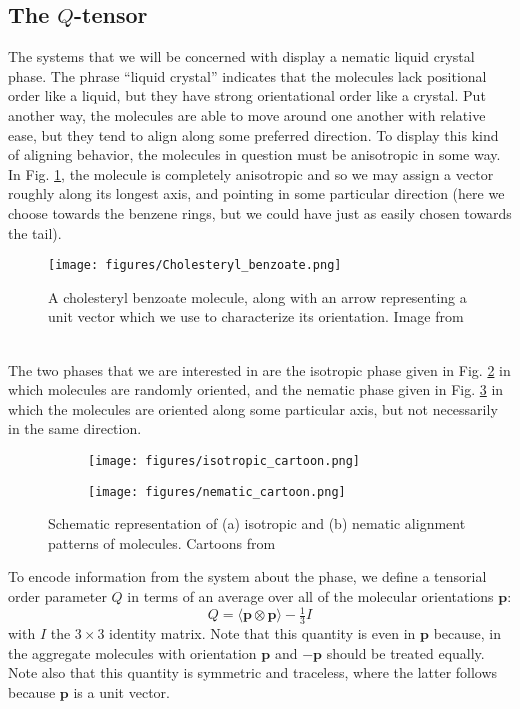 \documentclass[reqno]{article}
\begin{document}
	\subsection{The $Q$-tensor}
  The systems that we will be concerned with display a nematic liquid crystal phase.
  The phrase ``liquid crystal'' indicates that the molecules lack positional
  order like a liquid, but they have strong orientational order like a crystal.
  Put another way, the molecules are able to move around one another with
  relative ease, but they tend to align along some preferred direction.
  To display this kind of aligning behavior, the molecules in question must be
  anisotropic in some way.
  In Fig. \ref{fig:cholesteryl-benzoate}, the molecule is completely anisotropic and so we may
  assign a vector roughly along its longest axis, and pointing in some
  particular direction (here we choose towards the benzene rings, but we could
  have just as easily chosen towards the tail).
  \begin{figure}[h] 
    \centering
    \texttt{[image: figures/Cholesteryl\_benzoate.png]}
    \caption{A cholesteryl benzoate molecule, along with an arrow representing
      a unit vector which we use to characterize its orientation. Image from
      ~\cite{cholesteryl-benzoate}}
    \label{fig:cholesteryl-benzoate}
  \end{figure}

  The two phases that we are interested in are the isotropic phase given in
  Fig. \ref{fig:isotropic-cartoon} in which molecules are randomly oriented, and
  the nematic phase given in Fig. \ref{fig:nematic-cartoon} in which the
  molecules are oriented along some particular axis, but not necessarily in the
  same direction.
  \begin{figure}[h] 
    \centering
    \begin{subfigure}{0.4\textwidth}
      \texttt{[image: figures/isotropic\_cartoon.png]}
      \caption{}
      \label{fig:isotropic-cartoon}
    \end{subfigure}
    \hfill
    \begin{subfigure}{0.4\textwidth}
      \texttt{[image: figures/nematic\_cartoon.png]}
      \caption{}
      \label{fig:nematic-cartoon}
    \end{subfigure}
    \caption{Schematic representation of (a) isotropic and (b) nematic alignment
      patterns of molecules. Cartoons from ~\cite{selinger_introduction_2016}}
    \label{fig:alignment-cartoons}
  \end{figure}
  To encode information from the system about the phase, we define a tensorial
  order parameter $Q$ in terms of an average over all of the molecular
  orientations $\mathbf{p}$:
  \begin{equation} \label{eq:Q-def}
    Q = \langle \mathbf{p} \otimes \mathbf{p} \rangle - \tfrac13 I
  \end{equation}
  with $I$ the $3\times 3$ identity matrix.
  Note that this quantity is even in $\mathbf{p}$ because, in the aggregate
  molecules with orientation $\mathbf{p}$ and $-\mathbf{p}$ should be treated
  equally.
  Note also that this quantity is symmetric and traceless, where the latter
  follows because $\mathbf{p}$ is a unit vector.
\end{document}
